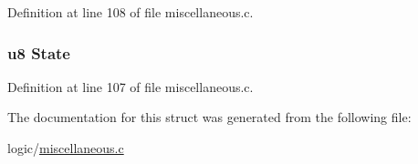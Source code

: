 \-Definition at line 108 of file miscellaneous.\-c.

\hypertarget{structnumstore_a35c66c877f571457e71e669b0c64d5b0}{
\subsubsection[{\-State}]{\setlength{\rightskip}{0pt plus 5cm}u8 {\bf \-State}}}\label{structnumstore_a35c66c877f571457e71e669b0c64d5b0}


\-Definition at line 107 of file miscellaneous.\-c.



\-The documentation for this struct was generated from the following file\-:\begin{DoxyCompactItemize}
\item 
logic/\hyperlink{miscellaneous_8c}{miscellaneous.\-c}\end{DoxyCompactItemize}
